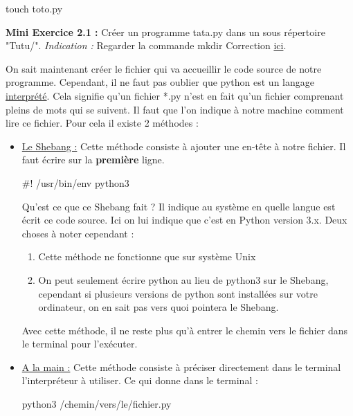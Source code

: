 \documentclass[a4paper,12pt]{article}
\begin{document}
\begin{bashcode}
    touch toto.py
\end{bashcode}

{\color{darkgreen}
\noindent\textbf{Mini Exercice 2.1 : } Créer un programme tata.py dans un sous répertoire "Tutu/". \newline
\textit{Indication : } Regarder la commande mkdir \newline
Correction \hyperlink{AncreExo2.1}{ici}.\newline
}

On sait maintenant créer le fichier qui va accueillir le code source de notre programme. Cependant, il ne faut pas oublier que python est un langage \underline{interprété}.
Cela signifie qu'un fichier *.py n'est en fait qu'un fichier comprenant pleins de mots qui se suivent. Il faut que l'on indique à notre machine comment lire ce fichier.
Pour cela il existe 2 méthodes : 
\begin{itemize}
    \item \underline{Le Shebang :} Cette méthode consiste à ajouter une en-tête à notre fichier. Il faut écrire sur la \textbf{première} ligne. 
        \begin{pythoncode}
    #! /usr/bin/env python3
        \end{pythoncode}
        Qu'est ce que ce Shebang fait ? Il indique au système en quelle langue est écrit ce code source. Ici on lui indique que c'est en Python version 3.x. 
        Deux choses à noter cependant : 
        \begin{enumerate}
            \item Cette méthode ne fonctionne que sur système Unix
            \item On peut seulement écrire python au lieu de python3 sur le Shebang, cependant si plusieurs versions de python sont installées sur votre ordinateur, on en sait pas vers quoi pointera le Shebang.
        \end{enumerate}
        Avec cette méthode, il ne reste plus qu'à entrer le chemin vers le fichier dans le terminal pour l'exécuter.
    \item \underline{A la main :} Cette méthode consiste à préciser directement dans le terminal \\
        l'interpréteur à utiliser. Ce qui donne dans le terminal :
        \begin{bashcode}
    python3 /chemin/vers/le/fichier.py
        \end{bashcode}
\end{itemize}
\end{document}
